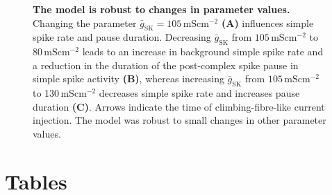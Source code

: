 \documentclass[utf8]{frontiersSCNS} %
\newcommand{\msi}{\,\mathrm{mS cm^{-2}}}
\newcommand{\sk}{\mathrm{SK}}
\begin{document}
\begin{figure}[!ht]
\caption{\textbf{The model is robust to changes in parameter values.}
 Changing the parameter $\bar{g}_\sk=105\msi$ \textbf{(A)} influences simple
  spike rate and pause duration. Decreasing $\bar{g}_\sk$ from
  $105\msi$ to 80$\msi$ leads to an increase in background simple spike
  rate and a reduction in the duration of the post-complex spike pause
  in simple spike activity \textbf{(B)}, whereas increasing
  $\bar{g}_\sk$ from $105\msi$ to 130$\msi$ decreases simple spike rate
  and increases pause duration \textbf{(C)}. Arrows indicate the time
  of climbing-fibre-like current injection. The model was robust to
  small changes in other parameter values.}
\label{S1_Fig}
\end{figure}








\section{Tables}
\end{document}
